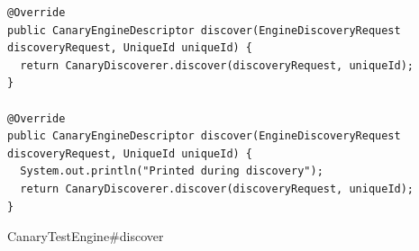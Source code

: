 \documentclass[12pt]{article}
\begin{document}
\begin{onehalfspacing}









\begin{listing}[H]
\begin{verbatim}
@Override
public CanaryEngineDescriptor discover(EngineDiscoveryRequest discoveryRequest, UniqueId uniqueId) {
  return CanaryDiscoverer.discover(discoveryRequest, uniqueId);
}

@Override
public CanaryEngineDescriptor discover(EngineDiscoveryRequest discoveryRequest, UniqueId uniqueId) {
  System.out.println("Printed during discovery");
  return CanaryDiscoverer.discover(discoveryRequest, uniqueId);
}
\end{verbatim}
\caption{CanaryTestEngine\#discover}
\label{lst:aa3}
\end{listing}













\end{onehalfspacing}
\end{document}
